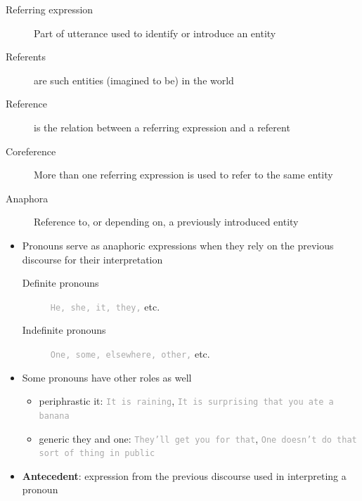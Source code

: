 \documentclass[landscape]{jhuslides3C}
\begin{document}

\vfill
\begin{description}
\item[Referring expression]
Part of  utterance used to identify or introduce an entity
\item[Referents]
are such entities (imagined to be) in the world
\item[Reference]
is the relation between a referring expression and a referent
\item[Coreference]
More than one referring expression is used to refer to the same entity
\item[Anaphora] Reference to, or depending on, a previously introduced entity
\end{description}
\vfill


\vfill
\begin{itemize}
\item  Pronouns serve as anaphoric expressions when they rely on the previous discourse for their
interpretation
\begin{description}
\item[Definite pronouns]
\textcolor{darkgrey}{\tt He, she, it, they,} etc.
\item[Indefinite pronouns]
\textcolor{darkgrey}{\tt One, some, elsewhere, other,} etc.\pause
\end{description}
\item Some pronouns have other roles as well
\begin{itemize}
\item periphrastic it: \textcolor{darkgrey}{\tt It is raining}, \textcolor{darkgrey}{\tt It is surprising that you ate a banana}
\item generic they and one: \textcolor{darkgrey}{\tt They'll get you for that}, \textcolor{darkgrey}{\tt One doesn't do that sort of thing in
public}\pause
\end{itemize}
\item {\bf Antecedent}: expression from the previous discourse used in interpreting a pronoun
\end{itemize}
\vfill

\end{document}
